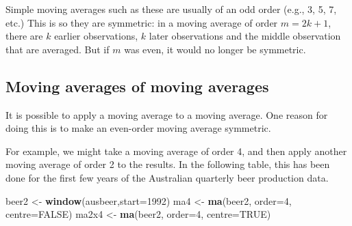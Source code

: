 \documentclass[]{book}
\newenvironment{Shaded}{\begin{snugshade}}{\end{snugshade}}
\newcommand{\DataTypeTok}[1]{\textcolor[rgb]{0.13,0.29,0.53}{#1}}
\newcommand{\DecValTok}[1]{\textcolor[rgb]{0.00,0.00,0.81}{#1}}
\newcommand{\KeywordTok}[1]{\textcolor[rgb]{0.13,0.29,0.53}{\textbf{#1}}}
\newcommand{\NormalTok}[1]{#1}
\newcommand{\OtherTok}[1]{\textcolor[rgb]{0.56,0.35,0.01}{#1}}
\newcommand{\StringTok}[1]{\textcolor[rgb]{0.31,0.60,0.02}{#1}}
\begin{document}
Simple moving averages such as these are usually of an odd order (e.g., 3, 5, 7, etc.) This is so they are symmetric: in a moving average of order \(m=2k+1\), there are \(k\) earlier observations, \(k\) later observations and the middle observation that are averaged. But if \(m\) was even, it would no longer be symmetric.

\hypertarget{moving-averages-of-moving-averages}{%
\subsection*{Moving averages of moving averages}\label{moving-averages-of-moving-averages}}

It is possible to apply a moving average to a moving average. One reason for doing this is to make an even-order moving average symmetric.

For example, we might take a moving average of order 4, and then apply another moving average of order 2 to the results. In the following table, this has been done for the first few years of the Australian quarterly beer production data.

\begin{Shaded}
\begin{Highlighting}[]
\NormalTok{beer2 <-}\StringTok{ }\KeywordTok{window}\NormalTok{(ausbeer,}\DataTypeTok{start=}\DecValTok{1992}\NormalTok{)}
\NormalTok{ma4 <-}\StringTok{ }\KeywordTok{ma}\NormalTok{(beer2, }\DataTypeTok{order=}\DecValTok{4}\NormalTok{, }\DataTypeTok{centre=}\OtherTok{FALSE}\NormalTok{)}
\NormalTok{ma2x4 <-}\StringTok{ }\KeywordTok{ma}\NormalTok{(beer2, }\DataTypeTok{order=}\DecValTok{4}\NormalTok{, }\DataTypeTok{centre=}\OtherTok{TRUE}\NormalTok{)}
\end{Highlighting}
\end{Shaded}
\end{document}
